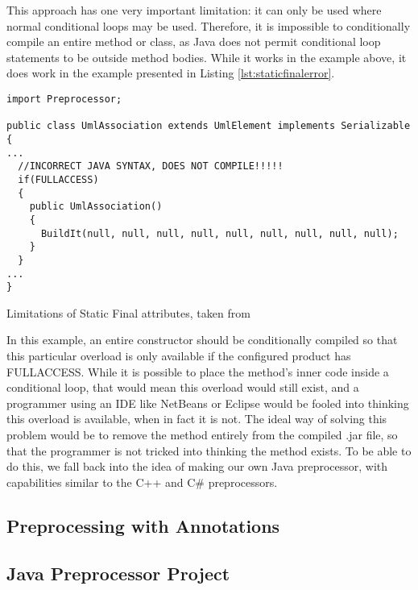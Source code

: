 This approach has one very important limitation: it can only be used where normal conditional loops may be used. Therefore, it is impossible to conditionally compile an entire method or class, as Java does not permit conditional loop statements to be outside method bodies. While it works in the example above, it does work in the example presented in Listing \ref{lst:staticfinalerror}.

\begin{listing}
\begin{verbatim}
import Preprocessor;

public class UmlAssociation extends UmlElement implements Serializable
{
...
  //INCORRECT JAVA SYNTAX, DOES NOT COMPILE!!!!!
  if(FULLACCESS)
  {
    public UmlAssociation()
    {
      BuildIt(null, null, null, null, null, null, null, null, null);
    }
  }
...
}
\end{verbatim}
\caption{Limitations of Static Final attributes, taken from \cite{AUTOREST}} \label{lst:staticfinalerror}
\end{listing}

In this example, an entire constructor should be conditionally compiled so that this particular overload is only available if the configured product has FULLACCESS. While it is possible to place the method's inner code inside a conditional loop, that would mean this overload would still exist, and a programmer using an IDE like NetBeans or Eclipse would be fooled into thinking this overload is available, when in fact it is not. The ideal way of solving this problem would be to remove the method entirely from the compiled .jar file, so that the programmer is not tricked into thinking the method exists. To be able to do this, we fall back into the idea of making our own Java preprocessor, with capabilities similar to the C++ and C\# preprocessors.


\subsection{Preprocessing with Annotations}


\subsection{Java Preprocessor Project}


